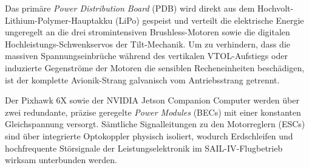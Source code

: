 Das primäre \textit{Power Distribution Board} (PDB) wird direkt aus dem Hochvolt-Lithium-Polymer-Hauptakku (LiPo) gespeist und verteilt die elektrische Energie ungeregelt an die drei stromintensiven Brushless-Motoren sowie 
die digitalen Hochleistungs-Schwenkservos der Tilt-Mechanik. Um zu verhindern, dass die massiven Spannungseinbrüche während des vertikalen VTOL-Aufstiegs oder induzierte Gegenströme der Motoren die sensiblen Recheneinheiten beschädigen, 
ist der komplette Avionik-Strang galvanisch vom Antriebsstrang getrennt.

Der Pixhawk 6X sowie der NVIDIA Jetson Companion Computer werden über zwei redundante, präzise geregelte \textit{Power Modules} (BECs) mit einer konstanten Gleichspannung versorgt. 
Sämtliche Signalleitungen zu den Motorreglern (ESCs) sind über integrierte Optokoppler physisch isoliert, wodurch Erdschleifen und hochfrequente Störsignale der Leistungselektronik im SAIL-IV-Flugbetrieb wirksam unterbunden werden.

